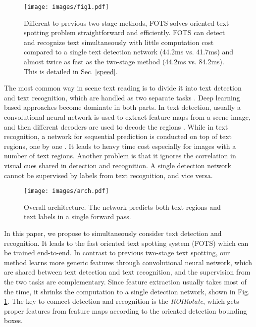 \documentclass[10pt,twocolumn,letterpaper]{article}
\begin{document}
\begin{figure}
  \texttt{[image: images/fig1.pdf]}
  \vspace{5pt}
  \caption{Different to previous two-stage methods, FOTS solves oriented text spotting problem straightforward and efficiently. FOTS can detect and recognize text simultaneously with little computation cost compared to a single text detection network (44.2ms vs. 41.7ms) and almost twice as fast as the two-stage method (44.2ms vs. 84.2ms). This is detailed in Sec. \ref{speed}.}
  \label{fig:fastdemo}
\end{figure}

The most common way in scene text reading is to divide it into text detection and text recognition, which are handled as two separate tasks \cite{jaderberg2016ijcv, liao2017textboxes}. Deep learning based approaches become dominate in both parts. In text detection, usually a convolutional neural network is used to extract feature maps from a scene image, and then different decoders are used to decode the regions \cite{tian2016ctpn,shi2017seglink,zhou2017east}. While in text recognition, a network for sequential prediction is conducted on top of text regions, one by one \cite{shi2016crnn, he2016first}. It leads to heavy time cost especially for images with a number of text regions. Another problem is that it ignores the correlation in visual cues shared in detection and recognition. A single detection network cannot be supervised by labels from text recognition, and vice versa.

\begin{figure*}
  \texttt{[image: images/arch.pdf]}
  \vspace{0pt}
  \caption{Overall architecture. The network predicts both text regions and text labels in a single forward pass.}
  \label{fig:architecture}
\end{figure*}

In this paper, we propose to simultaneously consider text detection and recognition. It leads to the fast oriented text spotting system (FOTS) which can be trained end-to-end. In contrast to previous two-stage text spotting, our method learns more generic features through convolutional neural network, which are shared between text detection and text recognition, and the supervision from the two tasks are complementary. Since feature extraction usually takes most of the time, it shrinks the computation to a single detection network, shown in Fig. \ref{fig:fastdemo}. The key to connect detection and recognition is the \emph{ROIRotate}, which gets proper features from feature maps according to the oriented detection bounding boxes.
\end{document}
